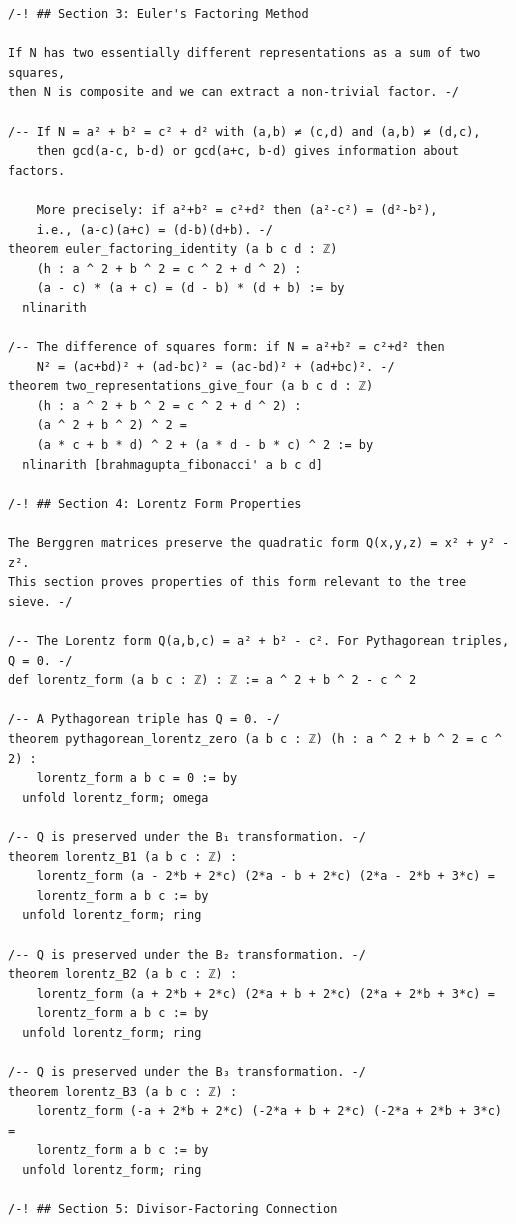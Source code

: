 \documentclass[11pt,openany]{book}
\theoremstyle{definition}
\theoremstyle{plain}
\theoremstyle{remark}
\begin{document}
\begin{lstlisting}[style=lean]
/-! ## Section 3: Euler's Factoring Method

If N has two essentially different representations as a sum of two squares,
then N is composite and we can extract a non-trivial factor. -/

/-- If N = a² + b² = c² + d² with (a,b) ≠ (c,d) and (a,b) ≠ (d,c),
    then gcd(a-c, b-d) or gcd(a+c, b-d) gives information about factors.
    
    More precisely: if a²+b² = c²+d² then (a²-c²) = (d²-b²),
    i.e., (a-c)(a+c) = (d-b)(d+b). -/
theorem euler_factoring_identity (a b c d : ℤ)
    (h : a ^ 2 + b ^ 2 = c ^ 2 + d ^ 2) :
    (a - c) * (a + c) = (d - b) * (d + b) := by
  nlinarith

/-- The difference of squares form: if N = a²+b² = c²+d² then
    N² = (ac+bd)² + (ad-bc)² = (ac-bd)² + (ad+bc)². -/
theorem two_representations_give_four (a b c d : ℤ)
    (h : a ^ 2 + b ^ 2 = c ^ 2 + d ^ 2) :
    (a ^ 2 + b ^ 2) ^ 2 =
    (a * c + b * d) ^ 2 + (a * d - b * c) ^ 2 := by
  nlinarith [brahmagupta_fibonacci' a b c d]

/-! ## Section 4: Lorentz Form Properties

The Berggren matrices preserve the quadratic form Q(x,y,z) = x² + y² - z².
This section proves properties of this form relevant to the tree sieve. -/

/-- The Lorentz form Q(a,b,c) = a² + b² - c². For Pythagorean triples, Q = 0. -/
def lorentz_form (a b c : ℤ) : ℤ := a ^ 2 + b ^ 2 - c ^ 2

/-- A Pythagorean triple has Q = 0. -/
theorem pythagorean_lorentz_zero (a b c : ℤ) (h : a ^ 2 + b ^ 2 = c ^ 2) :
    lorentz_form a b c = 0 := by
  unfold lorentz_form; omega

/-- Q is preserved under the B₁ transformation. -/
theorem lorentz_B1 (a b c : ℤ) :
    lorentz_form (a - 2*b + 2*c) (2*a - b + 2*c) (2*a - 2*b + 3*c) =
    lorentz_form a b c := by
  unfold lorentz_form; ring

/-- Q is preserved under the B₂ transformation. -/
theorem lorentz_B2 (a b c : ℤ) :
    lorentz_form (a + 2*b + 2*c) (2*a + b + 2*c) (2*a + 2*b + 3*c) =
    lorentz_form a b c := by
  unfold lorentz_form; ring

/-- Q is preserved under the B₃ transformation. -/
theorem lorentz_B3 (a b c : ℤ) :
    lorentz_form (-a + 2*b + 2*c) (-2*a + b + 2*c) (-2*a + 2*b + 3*c) =
    lorentz_form a b c := by
  unfold lorentz_form; ring

/-! ## Section 5: Divisor-Factoring Connection


\end{lstlisting}
\end{document}

